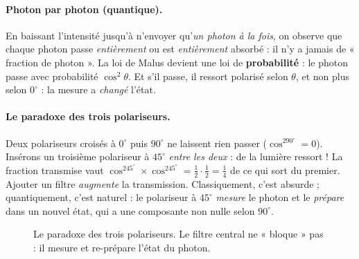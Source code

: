 \paragraph{Photon par photon (quantique).} En baissant l'intensité jusqu'à n'envoyer qu'\emph{un photon à la fois}, on observe que chaque photon passe \emph{entièrement} ou est \emph{entièrement} absorbé : il n'y a jamais de « fraction de photon ». La loi de Malus devient une loi de \textbf{probabilité} : le photon passe avec probabilité $\cos^2\theta$. Et s'il passe, il ressort polarisé selon $\theta$, et non plus selon $0^\circ$ : la mesure a \emph{changé} l'état.

\paragraph{Le paradoxe des trois polariseurs.} Deux polariseurs croisés à $0^\circ$ puis $90^\circ$ ne laissent rien passer ($\cos^290^\circ=0$). Insérons un troisième polariseur à $45^\circ$ \emph{entre les deux} : de la lumière ressort ! La fraction transmise vaut $\cos^245^\circ\times\cos^245^\circ=\tfrac12\cdot\tfrac12=\tfrac14$ de ce qui sort du premier. Ajouter un filtre \emph{augmente} la transmission. Classiquement, c'est absurde ; quantiquement, c'est naturel : le polariseur à $45^\circ$ \emph{mesure} le photon et le \emph{prépare} dans un nouvel état, qui a une composante non nulle selon $90^\circ$.

\begin{figure}[htbp]
\centering
{}
\caption{Le paradoxe des trois polariseurs. Le filtre central ne « bloque » pas : il mesure et re-prépare l'état du photon.}\label{fig:polariseurs}
\end{figure}

